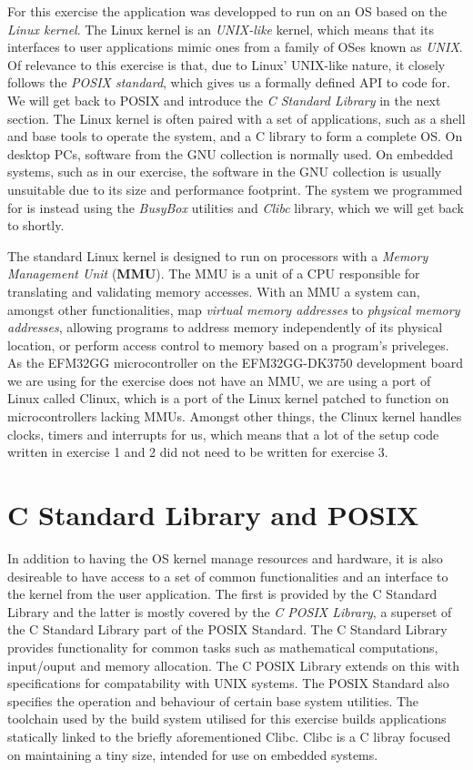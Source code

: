 For this exercise the application was developped to run on an OS based on the
\emph{Linux kernel}. The Linux kernel is an \emph{UNIX-like} kernel, which means
that its interfaces to user applications mimic ones from a family of OSes known
as \emph{UNIX}. Of relevance to this exercise is that, due to Linux' UNIX-like
nature, it closely follows the \emph{POSIX standard}, which gives us a formally
defined API to code for. We will get back to POSIX and introduce the \emph{C
Standard Library} in the next section. The Linux kernel is often paired with a
set of applications, such as a shell and base tools to operate the system, and a
C library to form a complete OS. On desktop PCs, software from the GNU
collection is normally used. On embedded systems, such as in our exercise, the
software in the GNU collection is usually unsuitable due to its size and
performance footprint. The system we programmed for is instead using the
\emph{BusyBox} utilities and \emph{\textmu Clibc} library, which we will get
back to shortly.

The standard Linux kernel is designed to run on processors with a \emph{Memory
Management Unit} (\textbf{MMU}). The MMU is a unit of a CPU responsible for
translating and validating memory accesses. With an MMU a system can, amongst
other functionalities, map \emph{virtual memory addresses} to \emph{physical
memory addresses}, allowing programs to address memory independently of its
physical location, or perform access control to memory based on a program's
priveleges. As the EFM32GG microcontroller on the EFM32GG-DK3750 development
board we are using for the exercise does not have an MMU, we are using a port of
Linux called \textmu Clinux, which is a port of the Linux kernel patched to
function on microcontrollers lacking MMUs. Amongst other things, the \textmu
Clinux kernel handles clocks, timers and interrupts for us, which means that a
lot of the setup code written in exercise 1 and 2 did not need to be written for
exercise 3.

\section{C Standard Library and POSIX}

In addition to having the OS kernel manage resources and hardware, it is also
desireable to have access to a set of common functionalities and an interface to
the kernel from the user application. The first is provided by the C Standard
Library and the latter is mostly covered by the \emph{C POSIX Library}, a
superset of the C Standard Library part of the POSIX Standard. The C Standard
Library provides functionality for common tasks such as mathematical
computations, input/ouput and memory allocation. The C POSIX Library extends on
this with specifications for compatability with UNIX systems. The POSIX Standard
also specifies the operation and behaviour of certain base system utilities. The
toolchain used by the build system utilised for this exercise builds
applications statically linked to the briefly aforementioned \textmu Clibc.
\textmu Clibc is a C libray focused on maintaining a tiny size, intended for use
on embedded systems.

